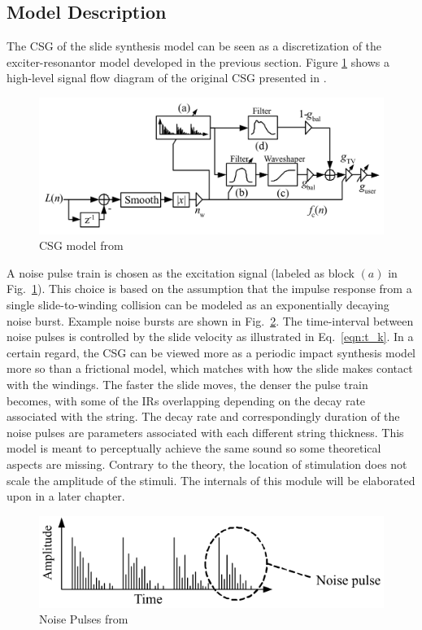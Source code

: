 \documentclass[main.tex]{subfiles}
\begin{document}
\subsection{Model Description}
The CSG of the slide synthesis model can be seen as a discretization of the exciter-resonantor model developed in the previous section. Figure \ref{fig:original_CSG} shows a high-level signal flow diagram of the original CSG presented in . 
\begin{figure}[h]
    \centering
    \includegraphics[scale=.50]{./images/pictures/CSG_original.PNG}
    \caption{CSG model from }
    \label{fig:original_CSG}
\end{figure}
A noise pulse train is chosen as the excitation signal (labeled as block $(a)$ in Fig.~\ref{fig:original_CSG}). This choice is based on the assumption that the impulse response from a single slide-to-winding collision can be modeled as an exponentially decaying noise burst. Example noise bursts are shown in Fig.~\ref{fig:noise_pulses_ch2}. The time-interval between noise pulses is controlled by the slide velocity as illustrated in Eq.~\ref{eqn:t_k}. In a certain regard, the CSG can be viewed more as a periodic impact synthesis model more so than a frictional model, which matches with how the slide makes contact with the windings. The faster the slide moves, the denser the pulse train becomes, with some of the IRs overlapping depending on the decay rate associated with the string. The decay rate and correspondingly duration of the noise pulses are parameters associated with each different string thickness. This model is meant to perceptually achieve the same sound so some theoretical aspects are missing. Contrary to the theory, the location of stimulation does not scale the amplitude of the stimuli. The internals of this module will be elaborated upon in a later chapter.

\begin{figure}[h]
    \centering
    \includegraphics[scale=1]{./images/pictures/noise_pulses.PNG}
    \caption{Noise Pulses from }
    \label{fig:noise_pulses_ch2}
\end{figure}
\end{document}
